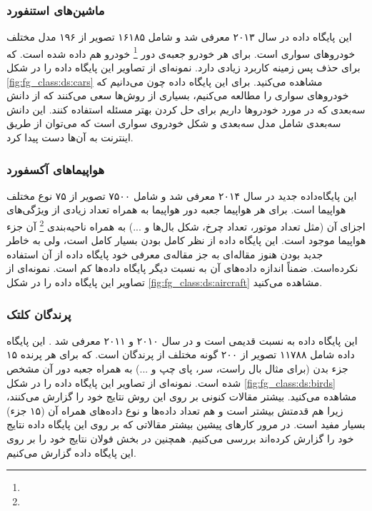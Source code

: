 \documentclass[11pt]{article}
\begin{document}
\subsubsection{ماشین‌های استنفورد}
این پایگاه داده در سال ۲۰۱۳ معرفی شد
\cite{stanford_cars}
و شامل ۱۶۱۸۵ تصویر از ۱۹۶ مدل مختلف خودروهای سواری است. برای هر خودرو جعبه‌ی دور
\footnote{}
خودرو هم داده شده است. که برای حذف پس زمینه کاربرد زیادی دارد. نمونه‌ای از تصاویر این پایگاه داده را در شکل
\ref{fig:fg_class:ds:cars}
مشاهده می‌کنید. برای این پایگاه داده چون می‌دانیم که خودروهای سواری را مطالعه می‌کنیم، بسیاری از روش‌ها
\cite{stanford_cars, krause2014, ramnath2014}
سعی می‌کنند که از دانش سه‌بعدی که در مورد خودروها داریم برای حل کردن بهتر مسئله استفاده کنند. این دانش سه‌بعدی شامل مدل سه‌بعدی و شکل خودروی سواری است که می‌توان از طریق اینترنت به آن‌ها دست پیدا کرد.

\subsubsection{هواپیماهای آکسفورد}
این پایگاه‌داده جدید در سال ۲۰۱۴ معرفی شد
\cite{oxford_aircraft}
و شامل ۷۵۰۰ تصویر از ۷۵ نوع مختلف هواپیما است. برای هر هواپیما جعبه دور هواپیما به همراه تعداد زیادی از ویژگی‌های اجزای آن (مثل تعداد موتور، تعداد چرخ، شکل بال‌ها و ...) به همراه ناحیه‌بندی
\footnote{}
آن جزء هواپیما موجود است. این پایگاه داده از نظر کامل بودن بسیار کامل است، ولی به خاطر جدید بودن هنوز مقاله‌ای به جز مقاله‌ی معرفی خود پایگاه داده از آن استفاده نکرده‌است. ضمناً اندازه داده‌های آن به نسبت دیگر پایگاه داده‌ها کم است. نمونه‌ای از تصاویر این پایگاه داده را در شکل
\ref{fig:fg_class:ds:aircraft}
مشاهده می‌کنید.

\subsubsection{پرندگان کلتک}
این پایگاه داده به نسبت قدیمی است و در سال ۲۰۱۰ و ۲۰۱۱ معرفی شد
\cite{cub2002011, cub2002010}.
این پایگاه داده شامل ۱۱۷۸۸ تصویر از ۲۰۰ گونه مختلف از پرندگان است. که برای هر پرنده ۱۵ جزء بدن (برای مثال بال راست، سر، پای چپ و ...) به همراه جعبه دور آن مشخص شده است. نمونه‌ای از تصاویر این پایگاه داده را در شکل
\ref{fig:fg_class:ds:birds}
مشاهده می‌کنید. بیشتر مقالات کنونی بر روی این روش نتایج خود را گزارش می‌کنند، زیرا هم قدمتش بیشتر است و هم تعداد داده‌ها و نوع داده‌های همراه آن (۱۵ جزء) بسیار مفید است. در مرور کارهای پیشین بیشتر مقالاتی که بر روی این پایگاه داده نتایج خود را گزارش کرده‌اند بررسی می‌کنیم. همچنین در بخش فولان نتایج خود را بر روی این پایگاه داده گزارش می‌کنیم.
\end{document}

